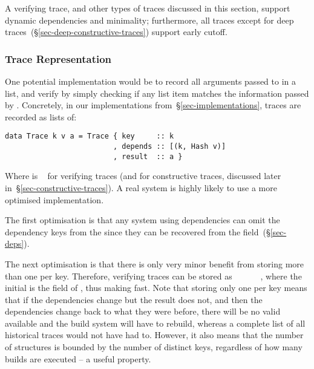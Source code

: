 
A verifying trace, and other types of traces discussed in this section, support
dynamic dependencies and minimality; furthermore, all traces except for deep
traces~(\S\ref{sec-deep-constructive-traces}) support early cutoff.

\subsubsection{Trace Representation}

One potential implementation would be to record all arguments passed to
 in a list, and verify by simply checking if any list item matches
the information passed by . Concretely, in our implementations
from~\S\ref{sec-implementations}, traces are recorded as lists of:

\vspace{1mm}
\begin{verbatim}
data Trace k v a = Trace { key     :: k
                         , depends :: [(k, Hash v)]
                         , result  :: a }
\end{verbatim}
\vspace{1mm}

\noindent
Where  is ~ for verifying traces (and  for
constructive traces, discussed later in~\S\ref{sec-constructive-traces}). A real
system is highly likely to use a more optimised implementation.

The first optimisation is that any system using  dependencies
can omit the dependency keys from the  since they can be recovered
from the  field~(\S\ref{sec-deps}).

The next optimisation is that there is only very minor benefit from storing more
than one  per key. Therefore, verifying traces can be stored as
~~~~~~, where the
initial  is the  field of , thus making 
fast. Note that storing only one  per key means that if the
dependencies change but the result does not, and then the dependencies change
back to what they were before, there will be no valid  available and
the build system will have to rebuild, whereas a complete list of all historical
traces would not have had to. However, it also means that the number of
 structures is bounded by the number of distinct keys, regardless of
how many builds are executed -- a useful property.

